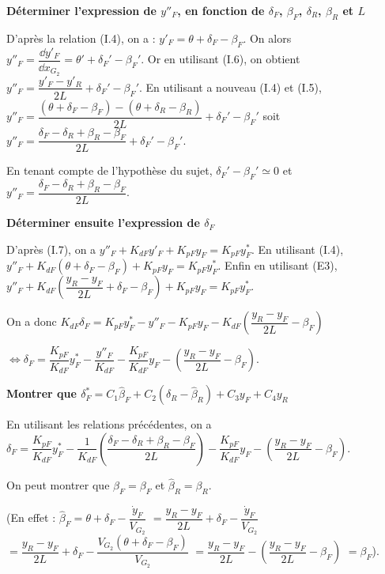 \documentclass[11pt]{article}
\begin{document}
\begin{UPSTIcorrige}
\textbf{Déterminer l’expression de $y''_F$, en fonction de $\delta_F$, $\beta_F$, $\delta_R$, $\beta_R$ et $L$}

D'après la relation (I.4), on a : $y'_F = \theta + \delta_F-\beta_F$. On  alors $y''_F =\dfrac{\dd y'_F}{\dd x_{G_2}} = \theta' + \delta_F'-\beta_F'$. Or en utilisant (I.6), on obtient 
$y''_F = \dfrac{y'_F-y'_R}{2L} + \delta_F'-\beta_F'$. En utilisant a nouveau (I.4) et (I.5), 
$y''_F = \dfrac{\left(\theta + \delta_F-\beta_F\right)-\left(\theta + \delta_R-\beta_R\right)}{2L} + \delta_F'-\beta_F'$
soit $y''_F = \dfrac{ \delta_F- \delta_R +\beta_R-\beta_F}{2L} + \delta_F'-\beta_F'$.

En tenant compte de l'hypothèse du sujet, $ \delta_F'-\beta_F'\simeq 0$ et 
$y''_F = \dfrac{ \delta_F- \delta_R +\beta_R-\beta_F}{2L}$.



\textbf{Déterminer ensuite l’expression de $\delta_F$}

D'après (I.7), on a $y''_F  + K_{dF}y'_F+K_{pF}y_F = K_{pF}y_F^*$. En utilisant (I.4),  
$y''_F  + K_{dF}\left(  \theta + \delta_F-\beta_F \right)+K_{pF}y_F = K_{pF}y_F^*$.
Enfin en utilisant (E3), 
$y''_F  + K_{dF}\left(  \dfrac{y_R-y_F}{2L} + \delta_F-\beta_F \right)+K_{pF}y_F = K_{pF}y_F^*$.

On a donc 
$K_{dF} \delta_F  = K_{pF}y_F^* - y''_F - K_{pF}y_F- K_{dF}\left(  \dfrac{y_R-y_F}{2L} -\beta_F \right)$

$\Leftrightarrow  \delta_F  = \dfrac{K_{pF}}{K_{dF}}y_F^* - \dfrac{y''_F}{K_{dF}} - \dfrac{K_{pF}}{K_{dF}}y_F- \left(  \dfrac{y_R-y_F}{2L} -\beta_F \right)$.

\textbf{Montrer que $\delta^*_F =C_1 \hat{\beta}_F +C_2\left(\delta_R - \hat{\beta}_R\right)+C_3 y_F + C_4 y_R$}

En utilisant les relations précédentes, on a 
$\delta_F  = \dfrac{K_{pF}}{K_{dF}}y_F^* - \dfrac{1}{K_{dF}}\left(  \dfrac{ \delta_F- \delta_R +\beta_R-\beta_F}{2L} \right) - \dfrac{K_{pF}}{K_{dF}}y_F- \left(  \dfrac{y_R-y_F}{2L} -\beta_F \right)$.


On peut montrer que  $\hat{\beta}_F= {\beta}_F$ et $\hat{\beta}_R= {\beta}_R$.

(En effet : $\hat{\beta}_F = \theta + \delta_F -\dfrac{\dot{y}_F}{V_{G_2}}$ 
$=\dfrac{y_R-y_F}{2L}+ \delta_F -\dfrac{\dot{y}_F}{V_{G_2}}$
$=\dfrac{y_R-y_F}{2L}+ \delta_F -\dfrac{V_{G_2}\left( \theta+\delta_F-\beta_F\right)}{V_{G_2}}$
$=\dfrac{y_R-y_F}{2L} -\left( \dfrac{y_R-y_F}{2L}-\beta_F\right)$ $=\beta_F$).



\end{UPSTIcorrige}
\end{document}
